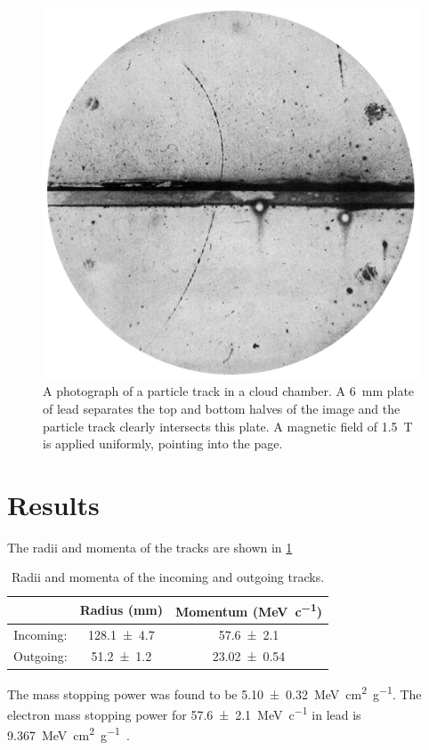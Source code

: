 \documentclass[11pt]{article}
\numberwithin{equation}{section}
\numberwithin{figure}{section}
\numberwithin{table}{section}
\begin{document}
\begin{figure}[h]
    \begin{center}
        \includegraphics[width=.5\textwidth]{Plots/positron_track.jpg}
        \caption{A photograph of a particle track in a cloud chamber. A \SI{6}{\milli\metre} plate of lead separates the top and bottom halves of the image and the particle track clearly intersects this plate. A magnetic field of \SI{1.5}{\tesla} is applied uniformly, pointing into the page. \cite{Pos_Electron}}
        \label{fig:positron_track}
    \end{center}
\end{figure}


\section{Results}\label{sec:Results}
The radii and momenta of the tracks are shown in \cref{tbl:results}

\begin{table}[H]
    \centering
    \begin{tabular}{c||c|c}
         & Radius (\si[]{\milli\metre}) & Momentum (\si[]{\mega\electronvolt\per c})\\ \hline
        Incoming: & \num{128.1\pm4.7} & \num{57.6\pm2.1} \\
        Outgoing: & \num{51.2\pm1.2} & \num{23.02\pm0.54}
    \end{tabular}
    \caption{Radii and momenta of the incoming and outgoing tracks.}
    \label{tbl:results}
\end{table}

The mass stopping power was found to be \SI{5.10\pm0.32}{\mega\electronvolt\centi\metre\squared\per\gram}. The electron mass stopping power for \SI{57.6\pm2.1}{\mega\electronvolt\per c} in lead is \SI{9.367}{\mega\electronvolt\centi\metre\squared\per\gram}~\cite{NIST_ESTAR}. 


\newpage
\printbibliography
\end{document}

